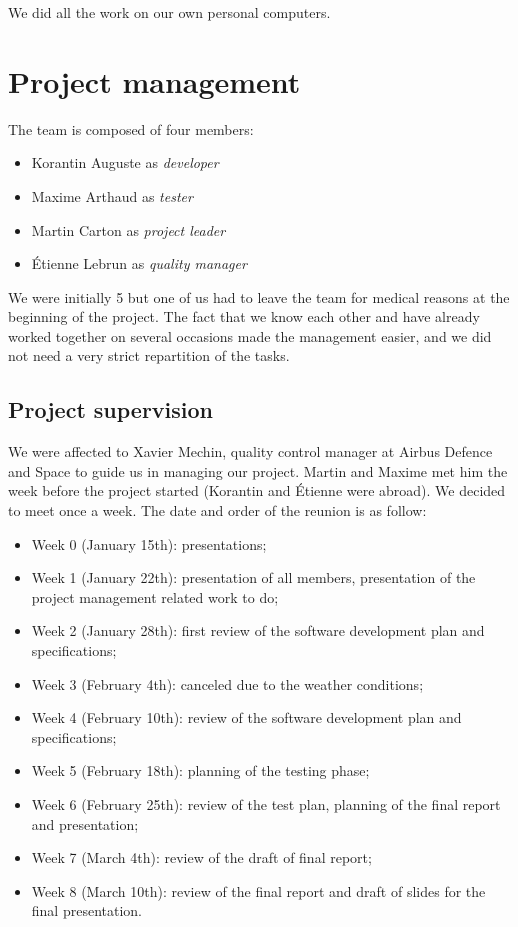 \documentclass[openany, a4paper]{book}
\begin{document}
      We did all the work on our own personal computers.

  \chapter{Project management}
    The team is composed of four members:
    \begin{itemize}
      \item Korantin Auguste as \textit{developer}
      \item Maxime Arthaud as \textit{tester}
      \item Martin Carton as \textit{project leader}
      \item Étienne Lebrun as \textit{quality manager}
    \end{itemize}

    We were initially 5 but one of us had to leave the team for medical reasons
    at the beginning of the project.
    The fact that we know each other and have already worked together on several
    occasions made the management easier, and we did not need a very strict
    repartition of the tasks.

    \section{Project supervision}
      We were affected to Xavier Mechin, quality control manager at Airbus
      Defence and Space to guide us in managing our project. Martin and Maxime
      met him the week before the project started (Korantin and Étienne were
      abroad). We decided to meet once a week. The date and order of the reunion
      is as follow:

      \begin{itemize}
        \item Week 0 (January 15th): presentations;
        \item Week 1 (January 22th): presentation of all members, presentation
          of the project management related work to do;
        \item Week 2 (January 28th): first review of the software development
          plan and specifications;
        \item Week 3 (February 4th): canceled due to the weather conditions;
        \item Week 4 (February 10th): review of the software development plan
          and specifications;
        \item Week 5 (February 18th): planning of the testing phase;
        \item Week 6 (February 25th): review of the test plan, planning of the
          final report and presentation;
        \item Week 7 (March 4th): review of the draft of final report;
        \item Week 8 (March 10th): review of the final report and draft of
          slides for the final presentation.
      \end{itemize}
\end{document}
